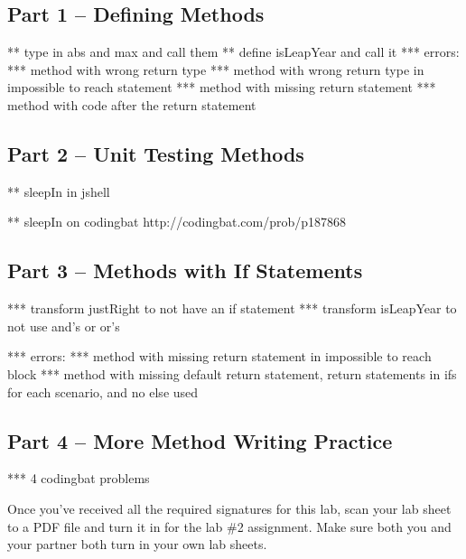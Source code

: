 \subsection{Part 1 -- Defining Methods}

** type in abs and max and call them
** define isLeapYear and call it
*** errors:
	*** method with wrong return type
	*** method with wrong return type in impossible to reach statement
	*** method with missing return statement
	*** method with code after the return statement

\initialbox


\subsection{Part 2 -- Unit Testing Methods}

** sleepIn in jshell

** sleepIn on codingbat http://codingbat.com/prob/p187868


\initialbox


\subsection{Part 3 -- Methods with If Statements}

*** transform justRight to not have an if statement
*** transform isLeapYear to not use and's or or's

*** errors:
	*** method with missing return statement in impossible to reach block
	*** method with missing default return statement, return statements in ifs for each scenario, and no else used


\initialbox


\subsection{Part 4 -- More Method Writing Practice}

*** 4 codingbat problems

\initialbox

Once you've received all the required signatures for this lab, scan your 
lab sheet to a PDF file and turn it in for the lab \#2 assignment. 
Make sure both you and your partner both turn in your own lab sheets. 
